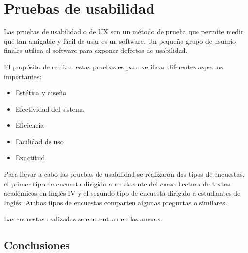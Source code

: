\documentclass[../Main.tex]{subfiles}
\begin{document}
    \section{Pruebas de usabilidad}
    \begin{justify}
    Las pruebas de usabilidad o de UX son un método de prueba que permite medir qué tan amigable y fácil de usar es un software. Un pequeño grupo de usuario finales utiliza el software para exponer defectos de usabilidad.
    
    El propósito de realizar estas pruebas es para verificar diferentes aspectos importantes:
    
    \begin{itemize}
        \item Estética y diseño
        \item Efectividad del sistema
        \item Eficiencia
        \item Facilidad de uso
        \item Exactitud

    \end{itemize}
    
    Para llevar a cabo las pruebas de usabilidad se realizaron dos tipos de encuestas, el primer tipo de encuesta dirigido a un docente del curso Lectura de textos académicos en Inglés IV y el segundo tipo de encuesta dirigido a estudiantes de Inglés. Ambos tipos de encuestas comparten algunas preguntas o similares.
    
    Las encuestas realizadas se encuentran en los anexos.
    
    \end{justify}
    
    \subsection{Conclusiones}
    \begin{justify}
    
    \end{justify}
\end{document}

